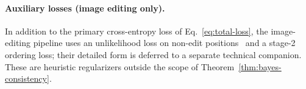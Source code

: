 \paragraph{Auxiliary losses (image editing only).}
In addition to the primary cross-entropy loss of Eq.~\eqref{eq:total-loss}, the image-editing pipeline uses an unlikelihood loss on non-edit positions~\cite{welleck2019neural} and a stage-2 ordering loss; their detailed form is deferred to a separate technical companion. These are heuristic regularizers outside the scope of Theorem~\ref{thm:bayes-consistency}.





